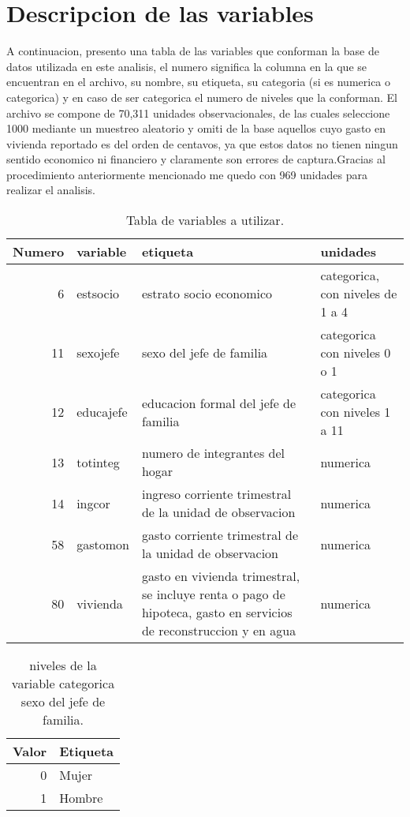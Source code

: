 \documentclass[]{book}
\begin{document}
\section{Descripcion de las
variables}\label{descripcion-de-las-variables}

A continuacion, presento una tabla de las variables que conforman la
base de datos utilizada en este analisis, el numero significa la columna
en la que se encuentran en el archivo, su nombre, su etiqueta, su
categoria (si es numerica o categorica) y en caso de ser categorica el
numero de niveles que la conforman. El archivo se compone de 70,311
unidades observacionales, de las cuales seleccione 1000 mediante un
muestreo aleatorio y omiti de la base aquellos cuyo gasto en vivienda
reportado es del orden de centavos, ya que estos datos no tienen ningun
sentido economico ni financiero y claramente son errores de
captura.Gracias al procedimiento anteriormente mencionado me quedo con
969 unidades para realizar el analisis.

\begin{table}

\caption{\label{tab:unnamed-chunk-7}Tabla de variables a utilizar.}
\centering
\begin{tabular}[t]{r|l|l|l}
\hline
Numero & variable & etiqueta & unidades\\
\hline
6 & estsocio & estrato socio economico & categorica, con niveles de 1 a 4\\
\hline
11 & sexojefe & sexo del jefe de familia & categorica con niveles 0 o 1\\
\hline
12 & educajefe & educacion formal del jefe de familia & categorica con niveles 1 a 11\\
\hline
13 & totinteg & numero de integrantes del hogar & numerica\\
\hline
14 & ingcor & ingreso corriente trimestral de la unidad de observacion & numerica\\
\hline
58 & gastomon & gasto corriente trimestral de la unidad de observacion & numerica\\
\hline
80 & vivienda & gasto en vivienda trimestral, se incluye renta o pago de hipoteca, gasto en servicios de reconstruccion y en agua & numerica\\
\hline
\end{tabular}
\end{table}

\begin{table}

\caption{\label{tab:unnamed-chunk-8} niveles de la variable categorica sexo del jefe de familia.}
\centering
\begin{tabular}[t]{r|l}
\hline
Valor & Etiqueta\\
\hline
0 & Mujer\\
\hline
1 & Hombre\\
\hline
\end{tabular}
\end{table}
\end{document}
